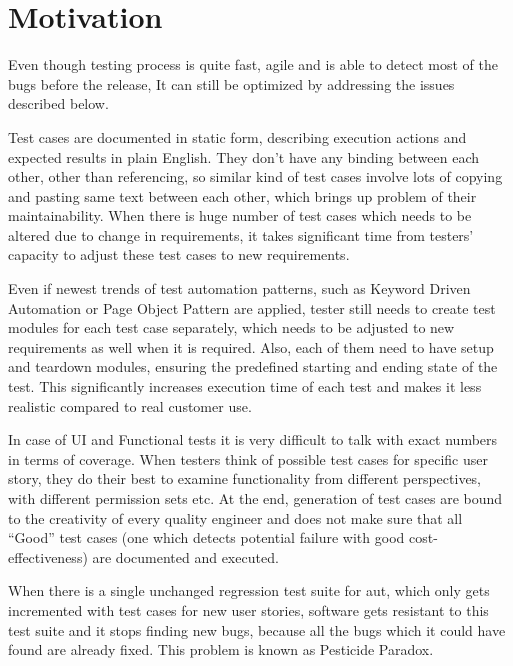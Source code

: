\section{Motivation}

\par
Even though testing process is quite fast, agile and is able to detect most of the bugs before the release, It can still be optimized by addressing the issues described below.

\par
Test cases are documented in static form, describing execution actions and expected results in plain English. They don't have any binding between each other, other than referencing, so similar kind of test cases involve lots of copying and pasting same text between each other, which brings up problem of their maintainability. When there is huge number of test cases which needs to be altered due to change in requirements, it takes significant time from testers' capacity to adjust these test cases to new requirements.

\par
Even if newest trends of test automation patterns, such as Keyword Driven Automation or Page Object Pattern are applied, tester still needs to create test modules for each test case separately, which needs to be adjusted to new requirements as well when it is required. Also, each of them need to have setup and teardown modules, ensuring the predefined starting and ending state of the test. This significantly increases execution time of each test and makes it less realistic compared to real customer use.

\par
In case of UI and Functional tests it is very difficult to talk with exact numbers in terms of coverage. When testers think of possible test cases for specific user story, they do their best to examine functionality from different perspectives, with different permission sets etc. At the end, generation of test cases are bound to the creativity of every quality engineer and does not make sure that all “Good” test cases (one which detects potential failure with good cost-effectiveness) are documented and executed.

\par
When there is a single unchanged regression test suite for \acrlong{aut}, which only gets incremented with test cases for new user stories, software gets resistant to this test suite and it stops finding new bugs, because all the bugs which it could have found are already fixed. This problem is known as Pesticide Paradox.

